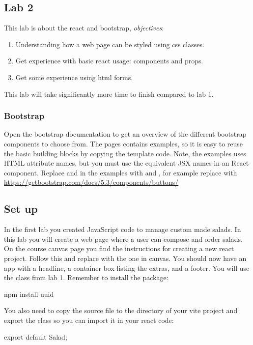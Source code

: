 \documentclass[fleqn, article, a4paper]{memoir}
\begin{document}
\maketitle
\thispagestyle{titlepage}
\vspace{-4cm}

\subsection*{Lab 2}

\n This lab is about the react and bootstrap, \emph{objectives}:

\begin{enumerate}\firmlist
\item Understanding how a web page can be styled using css classes.
\item Get experience with basic react usage: components and props.
\item Get some experience using html forms.
\end{enumerate}
\noindent This lab will take significantly more time to finish compared to lab 1.
\subsubsection*{Bootstrap}
Open the bootstrap documentation to get an overview of the different bootstrap components to choose from. The pages contains examples, so it is easy to reuse the basic building blocks by copying the template code. Note, the examples uses HTML attribute names, but you must use the equivalent JSX names in an React component. Replace  and  in the examples with  and , for example replace  with 
\\ \url{https://getbootstrap.com/docs/5.3/components/buttons/}

\subsection*{Set up}

In the first lab you created JavaScript code to manage custom made salads. In this lab you will create a web page where a user can compose and order salads. On the course canvas page you find the instructions for creating a new react project. Follow this and replace  with the one in canvas. You should now have an app with a headline, a container box listing the extras, and a footer. You will use the  class from lab 1. Remember to install the  package:
\begin{Code}
npm install uuid
\end{Code}
You also need to copy the source file to the  directory of your vite project and export the  class so you can import it in your react code:
\begin{Code}
export default Salad;
\end{Code}
\end{document}
